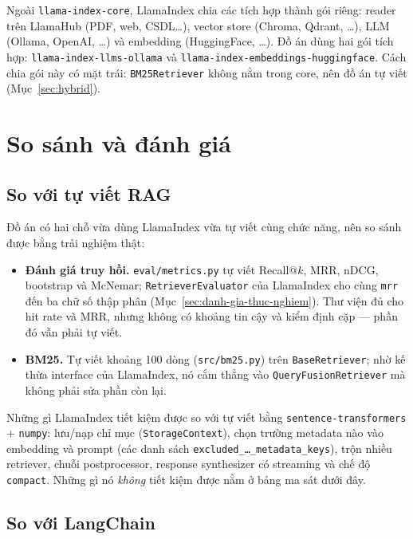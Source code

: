 Ngoài \texttt{llama-index-core}, LlamaIndex chia các tích hợp thành gói riêng: reader trên LlamaHub
(PDF, web, CSDL\ldots), vector store (Chroma, Qdrant, \ldots), LLM (Ollama, OpenAI, \ldots) và embedding
(HuggingFace, \ldots). Đồ án dùng hai gói tích hợp: \texttt{llama-index-llms-ollama} và
\texttt{llama-index-embeddings-huggingface}. Cách chia gói này có mặt trái: \texttt{BM25Retriever} không
nằm trong core, nên đồ án tự viết (Mục~\ref{sec:hybrid}).

\section{So sánh và đánh giá}
\label{sec:so-sanh}

\subsection{So với tự viết RAG}

Đồ án có hai chỗ vừa dùng LlamaIndex vừa tự viết cùng chức năng, nên so sánh được bằng trải nghiệm thật:

\begin{itemize}
  \item \textbf{Đánh giá truy hồi.} \texttt{eval/metrics.py} tự viết Recall@$k$, MRR, nDCG, bootstrap và
        McNemar; \texttt{RetrieverEvaluator} của LlamaIndex cho cùng \texttt{mrr} đến ba chữ số thập phân
        (Mục~\ref{sec:danh-gia-thuc-nghiem}). Thư viện đủ cho hit rate và MRR, nhưng không có khoảng tin
        cậy và kiểm định cặp --- phần đó vẫn phải tự viết.
  \item \textbf{BM25.} Tự viết khoảng 100 dòng (\texttt{src/bm25.py}) trên \texttt{BaseRetriever}; nhờ kế
        thừa interface của LlamaIndex, nó cắm thẳng vào \texttt{QueryFusionRetriever} mà không phải sửa
        phần còn lại.
\end{itemize}

Những gì LlamaIndex tiết kiệm được so với tự viết bằng \texttt{sentence-transformers} + \texttt{numpy}:
lưu/nạp chỉ mục (\texttt{StorageContext}), chọn trường metadata nào vào embedding và prompt
(các danh sách \texttt{excluded\_\ldots\_metadata\_keys}), trộn nhiều retriever, chuỗi postprocessor, response synthesizer
có streaming và chế độ \texttt{compact}. Những gì nó \emph{không} tiết kiệm được nằm ở bảng ma sát dưới đây.

\subsection{So với LangChain}

